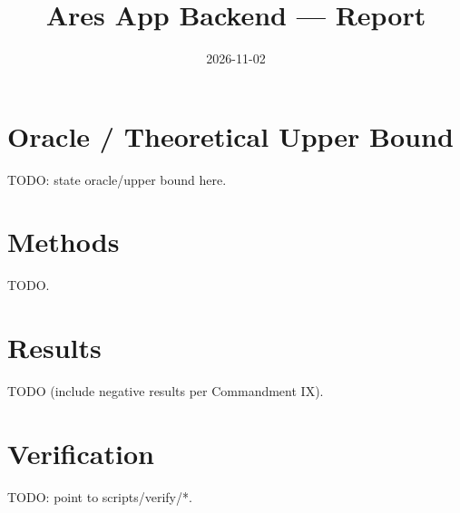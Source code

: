 \documentclass{article}
\title{Ares App Backend — Report}
\date{2026-11-02}
\begin{document}
\maketitle

\section{Oracle / Theoretical Upper Bound}
TODO: state oracle/upper bound here.

\section{Methods}
TODO.

\section{Results}
TODO (include negative results per Commandment IX).

\section{Verification}
TODO: point to scripts/verify/*.



\end{document}
